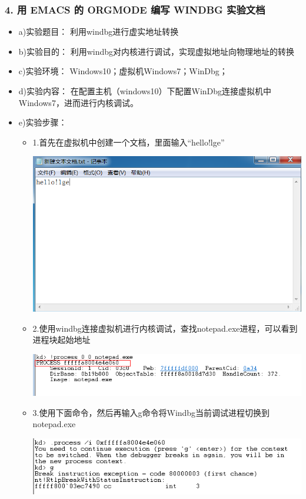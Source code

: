\documentclass[UTF8]{ctexart}
\begin{document}
\subsubsection*{4. 用 EMACS 的 ORGMODE 编写 WINDBG 实验文档}
\label{sec:org4e76691}
\begin{itemize}
\item a)实验题目：
\label{sec:orgb78406b}
利用windbg进行虚实地址转换
\item b)实验目的：
\label{sec:org9ab97ec}
利用windbg对内核进行调试，实现虚拟地址向物理地址的转换
\item c)实验环境：
\label{sec:orgc768209}
Windows10；虚拟机Windows7；WinDbg；
\item d)实验内容：
\label{sec:orgd52cd7f}
在配置主机（windows10）下配置WinDbg连接虚拟机中Windows7，进而进行内核调试。
\item e)实验步骤：
\label{sec:org3a2a58e}
\begin{itemize}
\item 1.首先在虚拟机中创建一个文档，里面输入“hello!lge”
\begin{center}
\includegraphics[width=.9\linewidth]{image/16.png}
\end{center}
\item 2.使用windbg连接虚拟机进行内核调试，查找notepad.exe进程，可以看到进程块起始地址
\begin{center}
\includegraphics[width=.9\linewidth]{image/17.png}
\end{center}
\item 3.使用下面命令，然后再输入g命令将Windbg当前调试进程切换到notepad.exe
\begin{center}
\includegraphics[width=.9\linewidth]{image/18.png}
\end{center}


\end{itemize}
\end{itemize}
\end{document}
